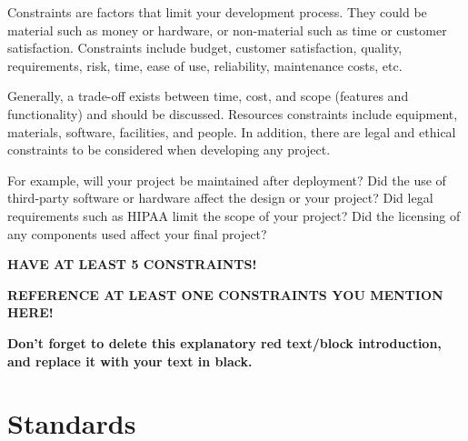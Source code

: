 \begin{tcolorbox}[      %
    boxrule=0pt,        %
    colback=white,      %
    coltext=red         %
]                       %
    Constraints are factors that limit your development process. They could be material such as money or hardware, or non-material such as time or customer satisfaction. Constraints include budget, customer satisfaction, quality, requirements, risk, time, ease of use, reliability, maintenance costs, etc.
    \vspace{15pt}
    
    Generally, a trade-off exists between time, cost, and scope (features and functionality) and should be discussed. Resources constraints include equipment, materials, software, facilities, and people. In addition, there are legal and ethical constraints to be considered when developing any project.
    \vspace{15pt}
    
    For example, will your project be maintained after deployment? Did the use of third-party software or hardware affect the design or your project? Did legal requirements such as HIPAA limit the scope of your project? Did the licensing of any components used affect your final project?
    \vspace{15pt}

    \textbf{HAVE AT LEAST 5 CONSTRAINTS!}
    \vspace{15pt}
    
    \textbf{REFERENCE AT LEAST ONE CONSTRAINTS YOU MENTION HERE!}

    \vspace{15pt}       %
    \begin{center}      %
    \textbf{Don't forget to delete this explanatory red text/block introduction, and replace it with your text in black.}
    \end{center}        %
\end{tcolorbox}         %

\newpage

\section{Standards} %

